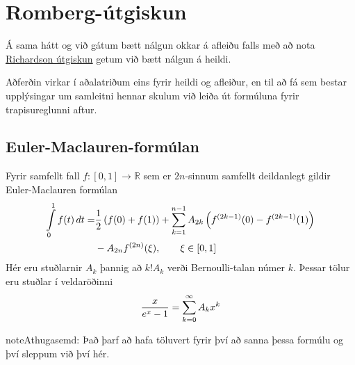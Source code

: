 \documentclass[letterpaper,10pt,icelandic]{sphinxmanual}
\begin{document}
\section{Romberg-útgiskun}
\label{kafli05:romberg-utgiskun}
Á sama hátt og við gátum bætt nálgun okkar á afleiðu falls með að nota
\href{https://notendur.hi.is/~bsm/stae405/kafli04.html\#richardson-utgiskun}{Richardson útgiskun}
getum við bætt nálgun á heildi.

Aðferðin virkar í aðalatriðum eins fyrir heildi og afleiður, en til að
fá sem bestar upplýsingar um samleitni hennar skulum við leiða út
formúluna fyrir trapisureglunni aftur.


\subsection{Euler-Maclauren-formúlan}
\label{kafli05:euler-maclauren-formulan}
Fyrir samfellt fall \(f : [0,1] \to \mathbb R\) sem er
\(2n\)-sinnum samfellt deildanlegt gildir Euler-Maclauren formúlan
\begin{gather}
\begin{split}\begin{aligned}
  \int\limits_0^1 f(t) \, dt
  =&  \frac{1}{2}\left( f(0) + f(1) \right)
  + \sum\limits_{k=1}^{n-1} A_{2k}
  \left( f^{(2k-1)}(0) - f^{(2k-1)}(1)\right) \\
  & - A_{2n}f^{(2n)}(\xi), \qquad \xi \in [0,1]\end{aligned}\end{split}\notag
\end{gather}
Hér eru stuðlarnir \(A_k\) þannig að \(k!A_k\) verði
Bernoulli-talan númer \(k\). Þessar tölur eru stuðlar í veldaröðinni
\begin{gather}
\begin{split}\frac{x}{e^x -1} = \sum\limits_{k=0}^{\infty}A_kx^k\end{split}\notag
\end{gather}
\begin{notice}{note}{Athugasemd:}
Það þarf að hafa töluvert fyrir því að sanna þessa formúlu og því sleppum
við því hér.
\end{notice}
\end{document}
